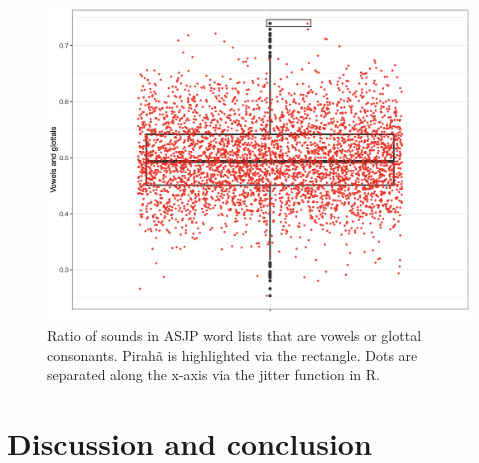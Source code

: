 \documentclass[output=paper,colorlinks,citecolor=brown
]{langscibook}
\begin{document}
\begin{figure}
\centering
\includegraphics[width=1\textwidth]{figures/everett_figure6.png}
\caption{\label{fig:Figure 6}Ratio of sounds in ASJP word lists that are vowels or glottal consonants. Pirahã is highlighted via the rectangle. Dots are separated along the x-axis via the jitter function in R. 
}

\end{figure}

\section{Discussion and conclusion}
\end{document}
